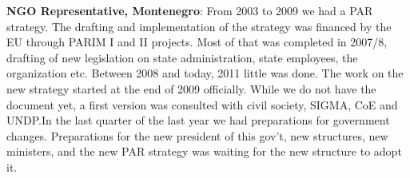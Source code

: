 \textbf{NGO Representative, Montenegro}: From 2003 to 2009 we had a PAR strategy. The drafting and implementation of the strategy was financed by the EU through PARIM I and II projects. Most of that was completed in 2007/8, drafting of new legislation on state administration, state employees, the organization etc. Between 2008 and today, 2011 little was done. The work on the new strategy started at the end of 2009 officially. While we do not have the document yet, a first version was consulted with civil society, SIGMA, CoE and UNDP.In the last quarter of the last year we had preparations for government changes. Preparations for the new president of this gov't, new structures, new ministers, and the new PAR strategy was waiting for the new structure to adopt it.%
